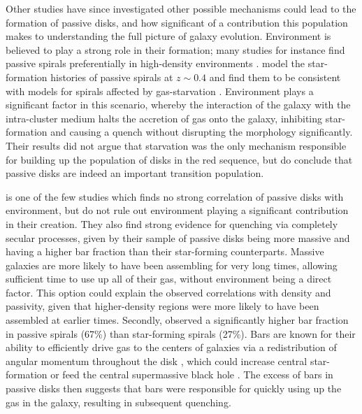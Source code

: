 \documentclass[useAMS,usenatbib]{mn2e}
\begin{document}
Other studies have since investigated other possible mechanisms could lead to the formation of passive disks, and how significant of a contribution this population makes to understanding the full picture of galaxy evolution. Environment is believed to play a strong role in their formation; many studies for instance find passive spirals preferentially in high-density environments \citep{Dressler1999, Poggianti1999, Goto2003, Deng2009, Hughes2009}. \citet{Moran2006} model the star-formation histories of passive spirals at $z\sim0.4$ and find them to be consistent with models for spirals affected by gas-starvation \citep{Larson1980, Quilis2000, Bekki2002}. Environment plays a significant factor in this scenario, whereby the interaction of the galaxy with the intra-cluster medium halts the accretion of gas onto the galaxy, inhibiting star-formation and causing a quench without disrupting the morphology significantly. Their results did not argue that starvation was the only mechanism responsible for building up the population of disks in the red sequence, but do conclude that passive disks are indeed an important transition population.

\citet{Masters2010} is one of the few studies which finds no strong correlation of passive disks with environment, but do not rule out environment playing a significant contribution in their creation. They also find strong evidence for quenching via completely secular processes, given by their sample of passive disks being more massive and having a higher bar fraction than their star-forming counterparts. Massive galaxies are more likely to have been assembling for very long times, allowing sufficient time to use up all of their gas, without environment being a direct factor. This option could explain the observed correlations with density and passivity, given that higher-density regions were more likely to have been assembled at earlier times. Secondly, \citet{Masters2010} observed a significantly higher bar fraction in passive spirals (67\%) than star-forming spirals (27\%). Bars are known for their ability to efficiently drive gas to the centers of galaxies via a redistribution of angular momentum throughout the disk \citep{Sellwood1993,Shlosman1989,Ann2005}, which could increase central star-formation \citep{Hawarden1986,Ho1997} or feed the central supermassive black hole \citep{Athanassoula1992,Friedli1993}. The excess of bars in passive disks then suggests that bars were responsible for quickly using up the gas in the galaxy, resulting in subsequent quenching. 
\end{document}
